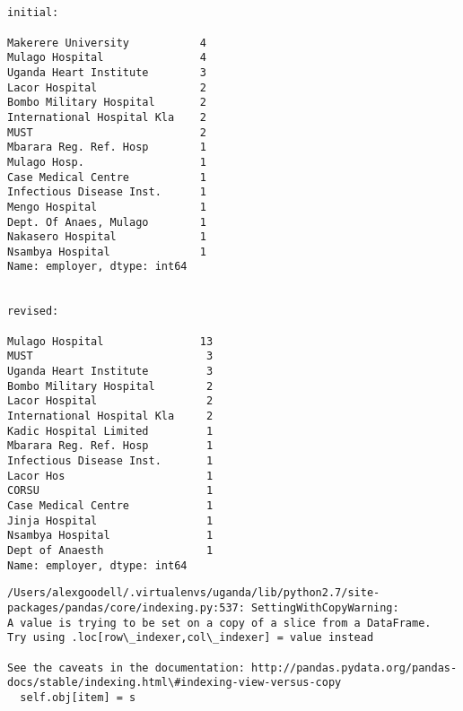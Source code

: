 \documentclass[11pt]{article}
\begin{document}
    \begin{Verbatim}[commandchars=\\\{\}]


initial:

Makerere University           4
Mulago Hospital               4
Uganda Heart Institute        3
Lacor Hospital                2
Bombo Military Hospital       2
International Hospital Kla    2
MUST                          2
Mbarara Reg. Ref. Hosp        1
Mulago Hosp.                  1
Case Medical Centre           1
Infectious Disease Inst.      1
Mengo Hospital                1
Dept. Of Anaes, Mulago        1
Nakasero Hospital             1
Nsambya Hospital              1
Name: employer, dtype: int64


revised:

Mulago Hospital               13
MUST                           3
Uganda Heart Institute         3
Bombo Military Hospital        2
Lacor Hospital                 2
International Hospital Kla     2
Kadic Hospital Limited         1
Mbarara Reg. Ref. Hosp         1
Infectious Disease Inst.       1
Lacor Hos                      1
CORSU                          1
Case Medical Centre            1
Jinja Hospital                 1
Nsambya Hospital               1
Dept of Anaesth                1
Name: employer, dtype: int64

    \end{Verbatim}

    \begin{Verbatim}[commandchars=\\\{\}]
/Users/alexgoodell/.virtualenvs/uganda/lib/python2.7/site-packages/pandas/core/indexing.py:537: SettingWithCopyWarning: 
A value is trying to be set on a copy of a slice from a DataFrame.
Try using .loc[row\_indexer,col\_indexer] = value instead

See the caveats in the documentation: http://pandas.pydata.org/pandas-docs/stable/indexing.html\#indexing-view-versus-copy
  self.obj[item] = s

    \end{Verbatim}
\end{document}
